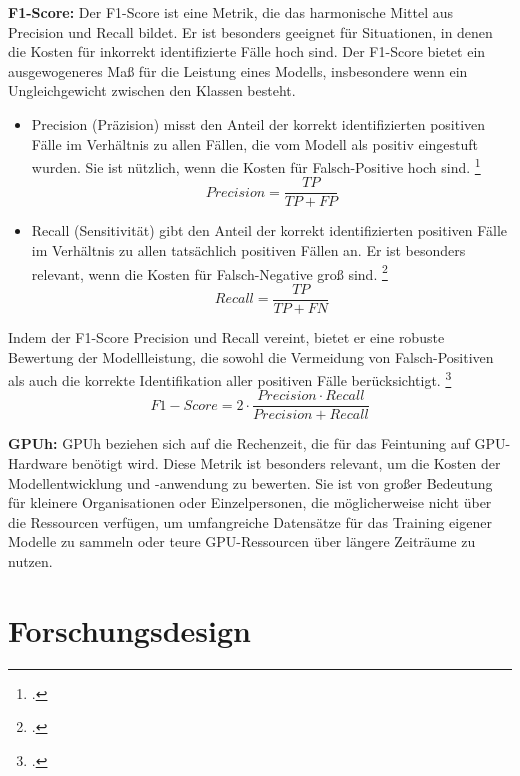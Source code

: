 \textbf{F1-Score:} Der F1-Score ist eine Metrik, die das harmonische Mittel aus Precision und Recall bildet. Er ist besonders geeignet für Situationen, in denen die Kosten für inkorrekt identifizierte Fälle hoch sind. Der F1-Score bietet ein ausgewogeneres Maß für die Leistung eines Modells, insbesondere wenn ein Ungleichgewicht zwischen den Klassen besteht.

\begin{itemize}
    \item Precision (Präzision) misst den Anteil der korrekt identifizierten positiven Fälle im Verhältnis zu allen Fällen, die vom Modell als positiv eingestuft wurden. Sie ist nützlich, wenn die Kosten für Falsch-Positive hoch sind. \footcites[Vgl.][S. 508]{naser_error_2023}
    \begin{equation}
        Precision = \frac{TP}{TP + FP}
    \end{equation}
    \item Recall (Sensitivität) gibt den Anteil der korrekt identifizierten positiven Fälle im Verhältnis zu allen tatsächlich positiven Fällen an. Er ist besonders relevant, wenn die Kosten für Falsch-Negative groß sind. \footcites[Vgl.][S. 508]{naser_error_2023}
    \begin{equation}
        Recall = \frac{TP}{TP + FN}
    \end{equation}
\end{itemize}

Indem der F1-Score Precision und Recall vereint, bietet er eine robuste Bewertung der Modellleistung, die sowohl die Vermeidung von Falsch-Positiven als auch die korrekte Identifikation aller positiven Fälle berücksichtigt. \footcites[Vgl.][S. 509]{naser_error_2023}
\begin{equation}
    F1-Score = 2 \cdot \frac{Precision \cdot Recall}{Precision + Recall}
\end{equation}

\textbf{GPUh:} \ac{GPUh} beziehen sich auf die Rechenzeit, die für das Feintuning auf GPU-Hardware benötigt wird. Diese Metrik ist besonders relevant, um die Kosten der Modellentwicklung und -anwendung zu bewerten. Sie ist von großer Bedeutung für kleinere Organisationen oder Einzelpersonen, die möglicherweise nicht über die Ressourcen verfügen, um umfangreiche Datensätze für das Training eigener Modelle zu sammeln oder teure GPU-Ressourcen über längere Zeiträume zu nutzen.

\section{Forschungsdesign}
